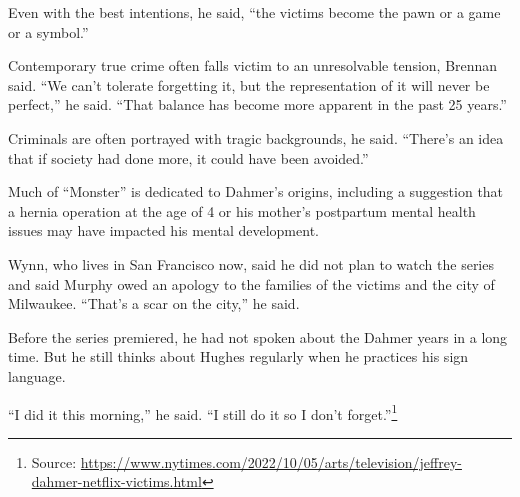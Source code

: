 \documentclass[10pt,a4paper]{article}
\newcommand{\source}[1]{\footnote{Source: \href{#1}{#1}}}
\begin{document}
Even with the best intentions, he said, “the victims become the pawn or a game or a symbol.”

Contemporary true crime often falls victim to an unresolvable tension, Brennan said. “We can’t tolerate forgetting it, but the representation of it will never be perfect,” he said. “That balance has become more apparent in the past 25 years.”

Criminals are often portrayed with tragic backgrounds, he said. “There’s an idea that if society had done more, it could have been avoided.”

Much of “Monster” is dedicated to Dahmer’s origins, including a suggestion that a hernia operation at the age of 4 or his mother’s postpartum mental health issues may have impacted his mental development.

Wynn, who lives in San Francisco now, said he did not plan to watch the series and said Murphy owed an apology to the families of the victims and the city of Milwaukee. “That’s a scar on the city,” he said.

Before the series premiered, he had not spoken about the Dahmer years in a long time. But he still thinks about Hughes regularly when he practices his sign language.

“I did it this morning,” he said. “I still do it so I don’t forget.”\source{https://www.nytimes.com/2022/10/05/arts/television/jeffrey-dahmer-netflix-victims.html}
\end{document}
